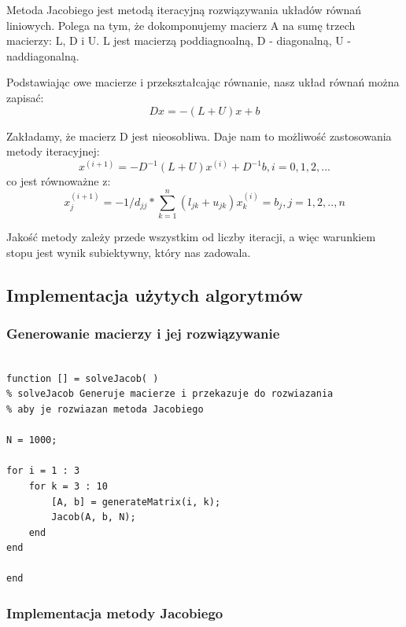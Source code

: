 \documentclass[11pt]{article} %
\begin{document}
Metoda Jacobiego jest metodą iteracyjną rozwiązywania układów równań liniowych. Polega na tym, że dokomponujemy macierz A na sumę trzech macierzy: L, D i U.
L jest macierzą poddiagnoalną, D - diagonalną, U - naddiagonalną.

Podstawiając owe macierze i przekształcając równanie, nasz układ równań można zapisać:
\begin{equation}
Dx = -(L + U)x +b
\end{equation}

Zakładamy, że macierz D jest nieosobliwa. Daje nam to możliwość zastosowania metody iteracyjnej:
\begin{equation}
x^{(i+1)} = -D^{-1}(L+U)x^{(i)} + D^{-1}b, i = 0,1,2,...
\end{equation}
co jest równoważne z:
\begin{equation}
x_{j}^{(i +1)} = - 1/d_{jj} * \sum_{k=1}^{n} (l_{jk} + u_{jk})x_{k}^{(i)} = b_{j}, j = 1,2,..,n
\end{equation}

Jakość metody zależy przede wszystkim od liczby iteracji, a więc warunkiem stopu jest wynik subiektywny, który nas zadowala.

\subsection{Implementacja użytych algorytmów}

\subsubsection{Generowanie macierzy i jej rozwiązywanie}

\begin{verbatim}

function [] = solveJacob( )
% solveJacob Generuje macierze i przekazuje do rozwiazania
% aby je rozwiazan metoda Jacobiego

N = 1000;

for i = 1 : 3
    for k = 3 : 10
        [A, b] = generateMatrix(i, k);
        Jacob(A, b, N);
    end
end

end

\end{verbatim}

\subsubsection{Implementacja metody Jacobiego}
\end{document}
